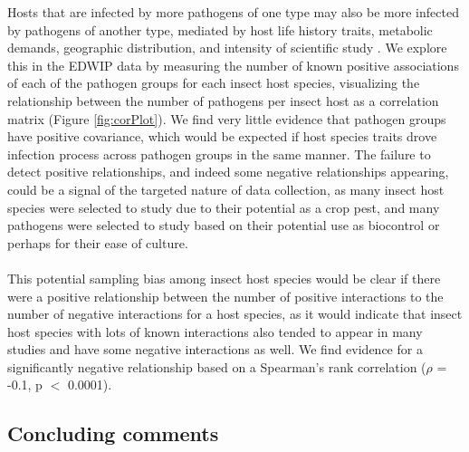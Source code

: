 \documentclass[12pt]{article}
\begin{document}
Hosts that are infected by more pathogens of one type may also be more infected by pathogens of another type, mediated by host life history traits, metabolic demands, geographic distribution, and intensity of scientific study \citep{dallas2021}. We explore this in the EDWIP data by measuring the number of known positive associations of each of the pathogen groups for each insect host species, visualizing the relationship between the number of pathogens per insect host as a correlation matrix (Figure \ref{fig:corPlot}). We find very little evidence that pathogen groups have positive covariance, which would be expected if host species traits drove infection process across pathogen groups in the same manner. The failure to detect positive relationships, and indeed some negative relationships appearing, could be a signal of the targeted nature of data collection, as many insect host species were selected to study due to their potential as a crop pest, and many pathogens were selected to study based on their potential use as biocontrol or perhaps for their ease of culture. 

\paragraph*{}
This potential sampling bias among insect host species would be clear if there were a positive relationship between the number of positive interactions to the number of negative interactions for a host species, as it would indicate that insect host species with lots of known interactions also tended to appear in many studies and have some negative interactions as well. We find evidence for a significantly negative relationship based on a Spearman's rank correlation ($\rho$ = -0.1, p $<$ 0.0001). 





















\subsection*{Concluding comments}
\end{document}
